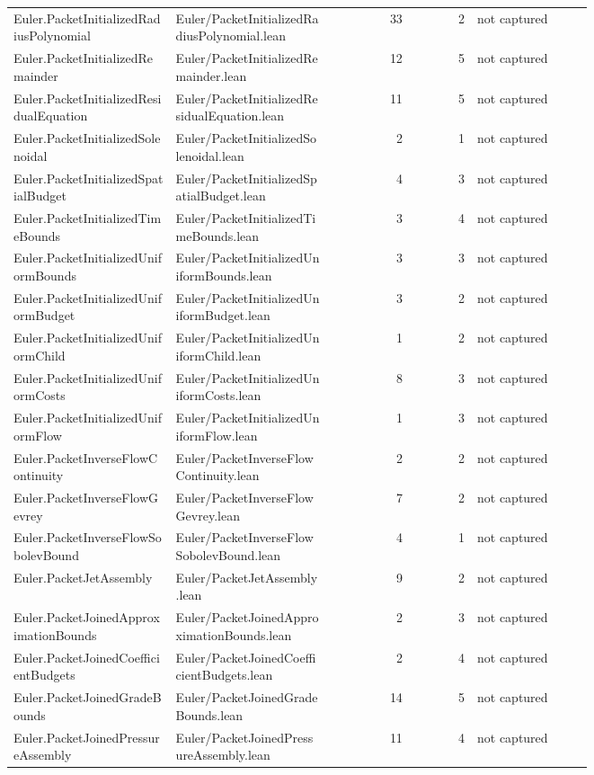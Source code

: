 \documentclass[10pt]{article}
\begin{document}
\begin{longtable}{p{0.28\linewidth}p{0.27\linewidth}r r p{0.20\linewidth}}
Euler.PacketInitializedRadiusPolynomial & Euler/PacketInitializedRadiusPolynomial.lean & 33 & 2 & not captured\\
Euler.PacketInitializedRemainder & Euler/PacketInitializedRemainder.lean & 12 & 5 & not captured\\
Euler.PacketInitializedResidualEquation & Euler/PacketInitializedResidualEquation.lean & 11 & 5 & not captured\\
Euler.PacketInitializedSolenoidal & Euler/PacketInitializedSolenoidal.lean & 2 & 1 & not captured\\
Euler.PacketInitializedSpatialBudget & Euler/PacketInitializedSpatialBudget.lean & 4 & 3 & not captured\\
Euler.PacketInitializedTimeBounds & Euler/PacketInitializedTimeBounds.lean & 3 & 4 & not captured\\
Euler.PacketInitializedUniformBounds & Euler/PacketInitializedUniformBounds.lean & 3 & 3 & not captured\\
Euler.PacketInitializedUniformBudget & Euler/PacketInitializedUniformBudget.lean & 3 & 2 & not captured\\
Euler.PacketInitializedUniformChild & Euler/PacketInitializedUniformChild.lean & 1 & 2 & not captured\\
Euler.PacketInitializedUniformCosts & Euler/PacketInitializedUniformCosts.lean & 8 & 3 & not captured\\
Euler.PacketInitializedUniformFlow & Euler/PacketInitializedUniformFlow.lean & 1 & 3 & not captured\\
Euler.PacketInverseFlowContinuity & Euler/PacketInverseFlowContinuity.lean & 2 & 2 & not captured\\
Euler.PacketInverseFlowGevrey & Euler/PacketInverseFlowGevrey.lean & 7 & 2 & not captured\\
Euler.PacketInverseFlowSobolevBound & Euler/PacketInverseFlowSobolevBound.lean & 4 & 1 & not captured\\
Euler.PacketJetAssembly & Euler/PacketJetAssembly.lean & 9 & 2 & not captured\\
Euler.PacketJoinedApproximationBounds & Euler/PacketJoinedApproximationBounds.lean & 2 & 3 & not captured\\
Euler.PacketJoinedCoefficientBudgets & Euler/PacketJoinedCoefficientBudgets.lean & 2 & 4 & not captured\\
Euler.PacketJoinedGradeBounds & Euler/PacketJoinedGradeBounds.lean & 14 & 5 & not captured\\
Euler.PacketJoinedPressureAssembly & Euler/PacketJoinedPressureAssembly.lean & 11 & 4 & not captured\\

\end{longtable}
\end{document}
